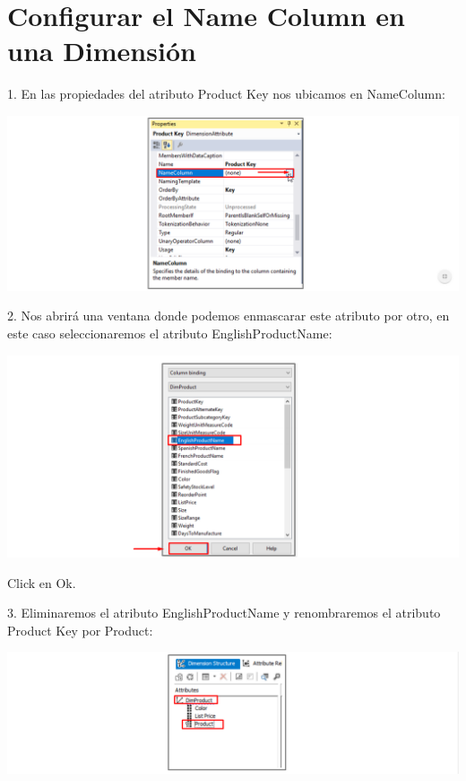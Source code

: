 \section{Configurar el Name Column en una Dimensión}  

1. En las propiedades del atributo Product Key nos ubicamos en NameColumn:

	\begin{center}
	\includegraphics[width=\columnwidth]{images/task1/img1}
	\end{center}	


2. Nos abrirá una ventana donde podemos enmascarar este atributo por otro, en este caso seleccionaremos el
atributo EnglishProductName:

	\begin{center}
	\includegraphics[width=\columnwidth]{images/task1/img2}
	\end{center}	

Click en Ok.

3. Eliminaremos el atributo EnglishProductName y renombraremos el atributo Product Key por Product:

	\begin{center}
	\includegraphics[width=\columnwidth]{images/task1/img3}
	\end{center}	

